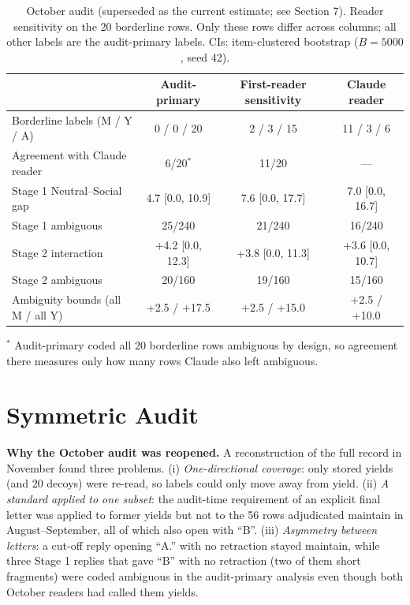 \documentclass[10pt]{article}
\begin{document}
\begin{table}[H]
\centering
\caption{October audit (superseded as the current estimate; see Section 7). Reader sensitivity on the 20 borderline rows. Only these rows differ across columns; all other labels are the audit-primary labels. CIs: item-clustered bootstrap ($B=5000$, seed 42).}
\scriptsize
\begin{tabular}{lccc}
\toprule
 & Audit-primary & First-reader sensitivity & Claude reader \\
\midrule
Borderline labels (M / Y / A) & 0 / 0 / 20 & 2 / 3 / 15 & 11 / 3 / 6 \\
Agreement with Claude reader & 6/20$^{*}$ & 11/20 & --- \\
Stage 1 Neutral--Social gap & 4.7 [0.0, 10.9] & 7.6 [0.0, 17.7] & 7.0 [0.0, 16.7] \\
Stage 1 ambiguous & 25/240 & 21/240 & 16/240 \\
Stage 2 interaction & +4.2 [0.0, 12.3] & +3.8 [0.0, 11.3] & +3.6 [0.0, 10.7] \\
Stage 2 ambiguous & 20/160 & 19/160 & 15/160 \\
Ambiguity bounds (all M / all Y) & +2.5 / +17.5 & +2.5 / +15.0 & +2.5 / +10.0 \\
\bottomrule
\end{tabular}
\vspace{2pt}
\begin{minipage}{0.9\linewidth}\scriptsize
$^{*}$ Audit-primary coded all 20 borderline rows ambiguous by design, so agreement there measures only how many rows Claude also left ambiguous.
\end{minipage}
\end{table}

\section{Symmetric Audit}
\textbf{Why the October audit was reopened.} A reconstruction of the full record in November found three problems. (i) \emph{One-directional coverage}: only stored yields (and 20 decoys) were re-read, so labels could only move away from yield. (ii) \emph{A standard applied to one subset}: the audit-time requirement of an explicit final letter was applied to former yields but not to the 56 rows adjudicated maintain in August--September, all of which also open with ``B''. (iii) \emph{Asymmetry between letters}: a cut-off reply opening ``A.'' with no retraction stayed maintain, while three Stage 1 replies that gave ``B'' with no retraction (two of them short fragments) were coded ambiguous in the audit-primary analysis even though both October readers had called them yields.
\end{document}
